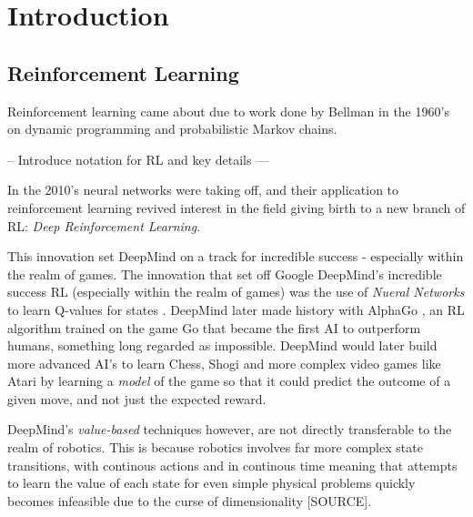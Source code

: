 \documentclass[logo,bsc,singlespacing,parskip]{infthesis}
\begin{document}




\chapter{Introduction}

\section{Reinforcement Learning}

Reinforcement learning came about due to work done by Bellman in the 1960's on dynamic programming and probabilistic Markov chains.  

-- Introduce notation for RL and key details --- 

In the 2010's neural networks were taking off, and their application to reinforcement learning revived interest in the field giving birth to a new branch of RL: \textit{Deep Reinforcement Learning}. 

This innovation set DeepMind on a track for incredible success - especially within the realm of games. 
The innovation that set off Google DeepMind's incredible success RL (especially within the realm of games) was the use of \textit{Nueral Networks} to learn Q-values for states \citet{Mnih2013PlayingLearning}. DeepMind later made history with AlphaGo \citet{Silver2016MasteringSearchb}, an RL algorithm trained on the game Go that became the first AI to outperform humans, something long regarded as impossible. DeepMind would later build more advanced AI's to learn Chess, Shogi and more complex video games like Atari \cite{Schrittwieser2020MasteringModel} by learning a \textit{model} of the game so that it could predict the outcome of a given move, and not just the expected reward. 

DeepMind's \textit{value-based} techniques however, are not directly transferable to the realm of robotics. This is because robotics involves far more complex state transitions, with continous actions and in continous time meaning that attempts to learn the value of each state for even simple physical problems quickly becomes infeasible due to the curse of dimensionality [SOURCE]. 
\end{document}
